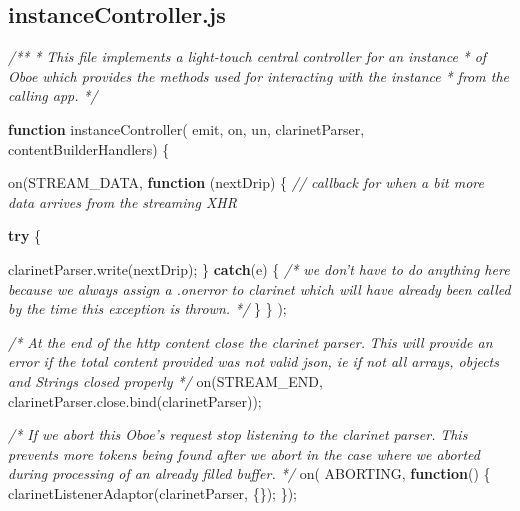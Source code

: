 \documentclass[12pt, ]{article}
\newenvironment{Shaded}{}{}
\newcommand{\KeywordTok}[1]{\textcolor[rgb]{0.00,0.44,0.13}{\textbf{{#1}}}}
\newcommand{\CommentTok}[1]{\textcolor[rgb]{0.38,0.63,0.69}{\textit{{#1}}}}
\newcommand{\OtherTok}[1]{\textcolor[rgb]{0.00,0.44,0.13}{{#1}}}
\newcommand{\FunctionTok}[1]{\textcolor[rgb]{0.02,0.16,0.49}{{#1}}}
\newcommand{\NormalTok}[1]{{#1}}
\begin{document}
\pagebreak

\subsection{instanceController.js}\label{headerux5finstanceController}

\label{src_instanceController}

\begin{Shaded}
\begin{Highlighting}[]
\CommentTok{/**}
\CommentTok{ * This file implements a light-touch central controller for an instance }
\CommentTok{ * of Oboe which provides the methods used for interacting with the instance }
\CommentTok{ * from the calling app.}
\CommentTok{ */}
 
 
\KeywordTok{function} \FunctionTok{instanceController}\NormalTok{(  emit, on, un, }
                              \NormalTok{clarinetParser, contentBuilderHandlers) \{}
                                
   \FunctionTok{on}\NormalTok{(STREAM_DATA,         }
      \KeywordTok{function} \NormalTok{(nextDrip) \{}
         \CommentTok{// callback for when a bit more data arrives from the streaming XHR         }
          
         \KeywordTok{try} \NormalTok{\{}
            
            \OtherTok{clarinetParser}\NormalTok{.}\FunctionTok{write}\NormalTok{(nextDrip);            }
         \NormalTok{\} }\KeywordTok{catch}\NormalTok{(e) \{ }
            \CommentTok{/* we don't have to do anything here because we always assign}
\CommentTok{               a .onerror to clarinet which will have already been called }
\CommentTok{               by the time this exception is thrown. */}                
         \NormalTok{\}}
      \NormalTok{\}}
   \NormalTok{);}
   
   \CommentTok{/* At the end of the http content close the clarinet parser.}
\CommentTok{      This will provide an error if the total content provided was not }
\CommentTok{      valid json, ie if not all arrays, objects and Strings closed properly */}
   \FunctionTok{on}\NormalTok{(STREAM_END, }\OtherTok{clarinetParser}\NormalTok{.}\OtherTok{close}\NormalTok{.}\FunctionTok{bind}\NormalTok{(clarinetParser));}
   

   \CommentTok{/* If we abort this Oboe's request stop listening to the clarinet parser. }
\CommentTok{      This prevents more tokens being found after we abort in the case where }
\CommentTok{      we aborted during processing of an already filled buffer. */}
   \FunctionTok{on}\NormalTok{( ABORTING, }\KeywordTok{function}\NormalTok{() \{}
      \FunctionTok{clarinetListenerAdaptor}\NormalTok{(clarinetParser, \{\});}
   \NormalTok{\});   }


\end{Highlighting}
\end{Shaded}
\end{document}
